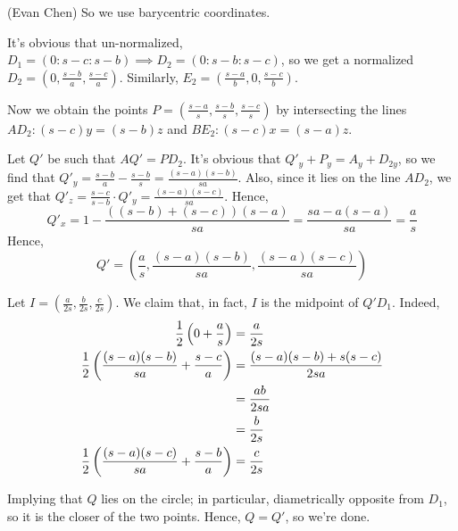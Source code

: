 \begin{soln}
  (Evan Chen) So we use barycentric coordinates.

  It's obvious that un-normalized, $D_1=(0:s-c:s-b) \implies D_2 = (0:s-b:s-c)$, so we get a normalized $D_2 = \left(0, \frac{s-b}{a}, \frac{s-c}{a}\right)$.  Similarly, $E_2 = \left(\frac{s-a}{b},0,\frac{s-c}{b}\right)$.

  Now we obtain the points $P=\left(\frac{s-a}{s}, \frac{s-b}{s}, \frac{s-c}{s}\right)$ by intersecting the lines $AD_2: (s-c)y=(s-b)z$ and $BE_2: (s-c)x=(s-a)z$.

  Let $Q'$ be such that $AQ' = PD_2$.  It's obvious that $Q'_y + P_y = A_y + D_{2y}$, so we find that $Q'_y = \frac{s-b}{a} - \frac{s-b}{s} = \frac{(s-a)(s-b)}{sa}$.  Also, since it lies on the line $AD_2$, we get that $Q'_z = \frac{s-c}{s-b} \cdot Q'_y = \frac{(s-a)(s-c)}{sa}$.  Hence, \[ Q'_x = 1 - \frac{((s-b)+(s-c))(s-a)}{sa} = \frac{sa - a(s-a)}{sa} = \frac{a}{s} \] Hence,
  \[ Q' = \left( \frac{a}{s}, \frac{(s-a)(s-b)}{sa}, \frac{(s-a)(s-c)}{sa}\right)\]

  Let $I = \left(\frac{a}{2s}, \frac{b}{2s}, \frac{c}{2s}\right)$.  We claim that, in fact, $I$ is the midpoint of $Q'D_1$.  Indeed,
  \begin{align*}
    \frac{1}{2} \left( 0 + \frac{a}{s} \right) &= \frac{a}{2s} \\
    \frac{1}{2} \left( \frac{(s-a)(s-b)}{sa} + \frac{s-c}{a} \right) &= \frac{(s-a)(s-b) + s(s-c) }{2sa} \\
    &= \frac{ab}{2sa} \\
    &= \frac{b}{2s} \\
    \frac{1}{2} \left( \frac{(s-a)(s-c)}{sa} + \frac{s-b}{a} \right) &= \frac{c}{2s}
  \end{align*}

  Implying that $Q$ lies on the circle; in particular, diametrically opposite from $D_1$, so it is the closer of the two points.  Hence, $Q=Q'$, so we're done.



\end{soln}
